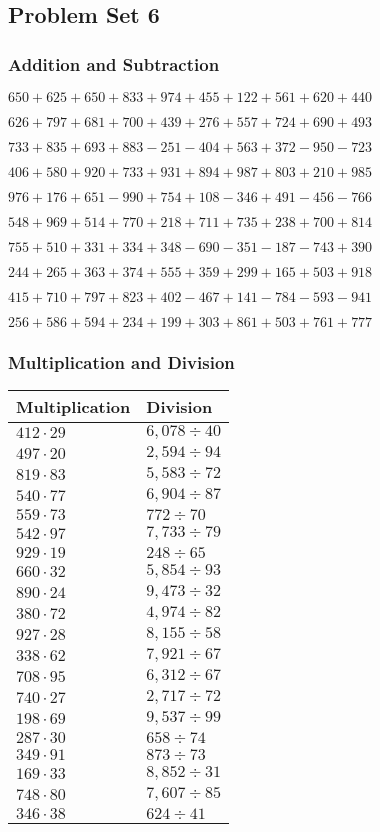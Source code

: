 \hypertarget{problem-set-6-2}{%
\subsection{Problem Set 6}\label{problem-set-6-2}}

\hypertarget{addition-and-subtraction-106}{%
\subsubsection{Addition and
Subtraction}\label{addition-and-subtraction-106}}

\(650 + 625 + 650 + 833 + 974 + 455 + 122 + 561 + 620 + 440\)

\(626 + 797 + 681 + 700 + 439 + 276 + 557 + 724 + 690 + 493\)

\(733 + 835 + 693 + 883 - 251 - 404 + 563 + 372 - 950 - 723\)

\(406 + 580 + 920 + 733 + 931 + 894 + 987 + 803 + 210 + 985\)

\(976 + 176 + 651 - 990 + 754 + 108 - 346 + 491 - 456 - 766\)

\(548 + 969 + 514 + 770 + 218 + 711 + 735 + 238 + 700 + 814\)

\(755 + 510 + 331 + 334 + 348 - 690 - 351 - 187 - 743 + 390\)

\(244 + 265 + 363 + 374 + 555 + 359 + 299 + 165 + 503 + 918\)

\(415 + 710 + 797 + 823 + 402 - 467 + 141 - 784 - 593 - 941\)

\(256 + 586 + 594 + 234 + 199 + 303 + 861 + 503 + 761 + 777\)

\hypertarget{multiplication-and-division-106}{%
\subsubsection{Multiplication and
Division}\label{multiplication-and-division-106}}

\begin{longtable}[]{@{}ll@{}}
\toprule
Multiplication & Division\tabularnewline
\midrule
\endhead
\(412 \cdot 29\) & \(6,078÷40\)\tabularnewline
\(497 \cdot 20\) & \(2,594÷94\)\tabularnewline
\(819 \cdot 83\) & \(5,583÷72\)\tabularnewline
\(540 \cdot 77\) & \(6,904÷87\)\tabularnewline
\(559 \cdot 73\) & \(772÷70\)\tabularnewline
\(542 \cdot 97\) & \(7,733÷79\)\tabularnewline
\(929 \cdot 19\) & \(248÷65\)\tabularnewline
\(660 \cdot 32\) & \(5,854÷93\)\tabularnewline
\(890 \cdot 24\) & \(9,473÷32\)\tabularnewline
\(380 \cdot 72\) & \(4,974÷82\)\tabularnewline
\(927 \cdot 28\) & \(8,155÷58\)\tabularnewline
\(338 \cdot 62\) & \(7,921÷67\)\tabularnewline
\(708 \cdot 95\) & \(6,312÷67\)\tabularnewline
\(740 \cdot 27\) & \(2,717÷72\)\tabularnewline
\(198 \cdot 69\) & \(9,537÷99\)\tabularnewline
\(287 \cdot 30\) & \(658÷74\)\tabularnewline
\(349 \cdot 91\) & \(873÷73\)\tabularnewline
\(169 \cdot 33\) & \(8,852÷31\)\tabularnewline
\(748 \cdot 80\) & \(7,607÷85\)\tabularnewline
\(346 \cdot 38\) & \(624÷41\)\tabularnewline
\bottomrule
\end{longtable}

